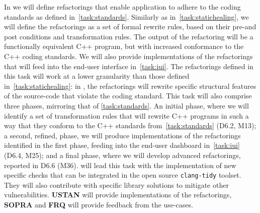 \begin{Workpackage}{\thewpno}
\begin{Task}


	\TaskResults{%
	}
	\TaskHeader{}
	
        
     	In \theTask{} we will define refactorings that enable application to adhere to the coding standards as defined in~\ref{task:standards}. Similarly as in~\ref{task:statichealing}, we will define the refactorings as a set of formal rewrite rules, based on their pre-and post conditions and transformation rules. The output of the refactoring will be a functionally equivalent C++ program, but with increased conformance to the C++ coding standards. We will also provide implementations of the refactorings that will feed into the end-user interface in~\ref{task:iui}. The refactorings defined in this task will work at a lower granularity than those defined in~\ref{task:statichealing}: in \theTask{}, the refactorings will rewrite specific structural features of the source-code that violate the coding standard. 
     This task will also comprise three phases, mirroring that of \ref{task:standards}. An initial phase, where we will identify a set of transformation rules that will rewrite C++ programs in such a way that they conform to the C++ standards from~\ref{task:standards} (D6.2, M13);  a second, refined, phase, we will produce implementations of the refactorings identified in the first phase, feeding into the end-user dashboard in~\ref{task:iui} (D6.4, M25); and a final phase, where we will develop advanced refactorings, reported in D6.6 (M36).
%
        \UCMshort{} will lead this task with the implementation
        of new specific checks that can be integrated in the open source
        \texttt{clang-tidy} toolset. They will also contribute with specific
        library solutions to mitigate other vulnerabilities.  \textbf{USTAN} will provide implementations of the refactorings, \textbf{SOPRA} and \textbf{FRQ} will provide feedback from the use-cases.
\end{Task}

\begin{Task}




\end{Task}
\end{Workpackage}
